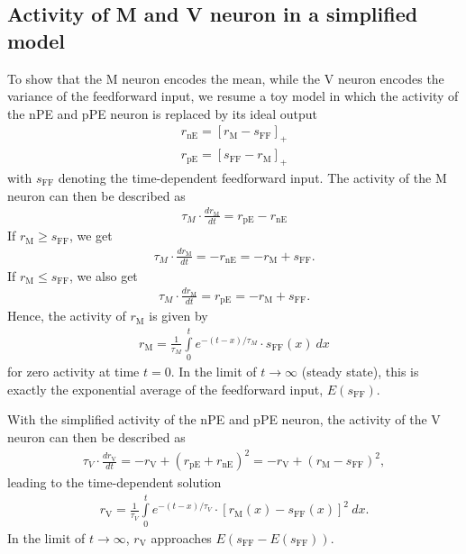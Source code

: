 \documentclass[10pt,a4paper,draft]{article}
\begin{document}
\subsection{Activity of M and V neuron in a simplified model}\label{sec:toy}
%
To show that the M neuron encodes the mean, while the V neuron encodes the variance of the feedforward input, we resume a toy model in which the activity of the nPE and pPE neuron is replaced by its ideal output
%
\begin{align}
r_\mathrm{nE} = \left[ r_\mathrm{M} - s_\mathrm{FF}\right]_+ \nonumber \\
r_\mathrm{pE} = \left[ s_\mathrm{FF} - r_\mathrm{M} \right]_+
\end{align}
%
with $s_\mathrm{FF}$ denoting the time-dependent feedforward input. The activity of the M neuron can then be described as
%
\begin{align}
\tau_M \cdot \frac{dr_\mathrm{M}}{dt} = r_\mathrm{pE} - r_\mathrm{nE}
\end{align}
%
If $r_\mathrm{M} \geq s_\mathrm{FF}$, we get
%
\begin{align}
\tau_M \cdot \frac{dr_\mathrm{M}}{dt} = -r_\mathrm{nE} = -r_\mathrm{M} + s_\mathrm{FF}.
\end{align}
%
If $r_\mathrm{M} \leq s_\mathrm{FF}$, we also get
%
\begin{align}
\tau_M \cdot \frac{dr_\mathrm{M}}{dt} = r_\mathrm{pE} = -r_\mathrm{M} + s_\mathrm{FF}.\nonumber
\end{align}
%
Hence, the activity of $r_\mathrm{M}$ is given by
%
\begin{align}
r_\mathrm{M} = \frac{1}{\tau_M} \int\limits_0^t e^{-(t-x)/\tau_M}\cdot s_\mathrm{FF}(x)\ dx
\end{align}  
%
for zero activity at time $t=0$. In the limit of $t\rightarrow \infty$ (steady state), this is exactly the exponential average of the feedforward input, $E(s_\mathrm{FF})$.

With the simplified activity of the nPE and pPE neuron, the activity of the V neuron can then be described as
%
\begin{align}
\tau_V \cdot \frac{dr_\mathrm{V}}{dt} = -r_\mathrm{V} + (r_\mathrm{pE} +  r_\mathrm{nE})^2 = -r_\mathrm{V}  + (r_\mathrm{M} -  s_\mathrm{FF})^2,
\end{align}
%
leading to the time-dependent solution
%
\begin{align}
r_\mathrm{V} = \frac{1}{\tau_V} \int\limits_0^t e^{-(t-x)/\tau_V}\cdot \left[r_\mathrm{M}(x) -  s_\mathrm{FF}(x)\right]^2\ dx.
\end{align}  
%
In the limit of $t\rightarrow \infty$, $r_\mathrm{V}$ approaches $E(s_\mathrm{FF} - E(s_\mathrm{FF}))$.
\end{document}
